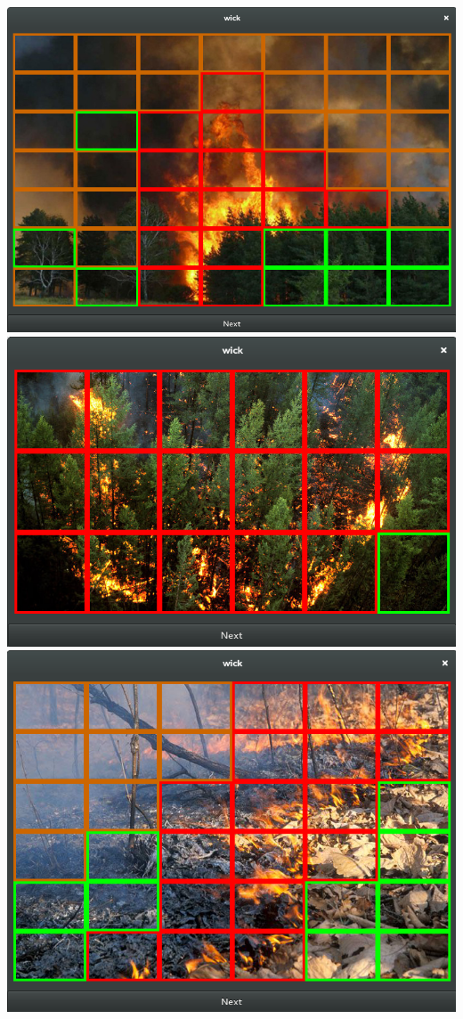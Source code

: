 \documentclass{article}
\begin{document}
\begin{center}
    \includegraphics[width=\textwidth]{wick-class-04}
    \includegraphics[width=\textwidth]{wick-class-05}
    \includegraphics[width=\textwidth]{wick-class-06}

\end{center}
\end{document}
